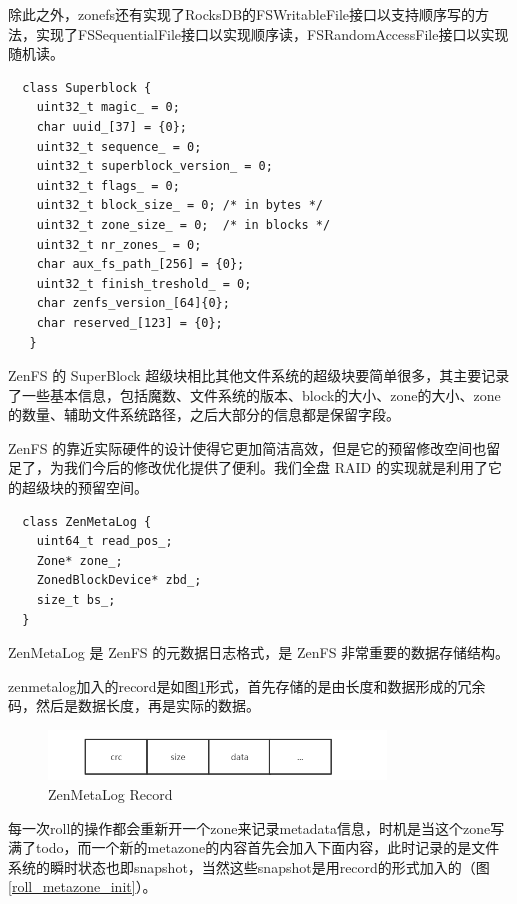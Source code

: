 除此之外，zonefs还有实现了RocksDB的FSWritableFile接口以支持顺序写的方法，实现了FSSequentialFile接口以实现顺序读，FSRandomAccessFile接口以实现随机读。


\begin{lstlisting}
  class Superblock {
    uint32_t magic_ = 0;
    char uuid_[37] = {0};
    uint32_t sequence_ = 0;
    uint32_t superblock_version_ = 0;
    uint32_t flags_ = 0;
    uint32_t block_size_ = 0; /* in bytes */
    uint32_t zone_size_ = 0;  /* in blocks */
    uint32_t nr_zones_ = 0;
    char aux_fs_path_[256] = {0};
    uint32_t finish_treshold_ = 0;
    char zenfs_version_[64]{0};
    char reserved_[123] = {0};
   }  
\end{lstlisting}

ZenFS 的 SuperBlock 超级块相比其他文件系统的超级块要简单很多，其主要记录了一些基本信息，包括魔数、文件系统的版本、block的大小、zone的大小、zone的数量、辅助文件系统路径，之后大部分的信息都是保留字段。

ZenFS 的靠近实际硬件的设计使得它更加简洁高效，但是它的预留修改空间也留足了，为我们今后的修改优化提供了便利。我们全盘 RAID 的实现就是利用了它的超级块的预留空间。


\begin{lstlisting}
  class ZenMetaLog {
    uint64_t read_pos_;
    Zone* zone_;
    ZonedBlockDevice* zbd_;
    size_t bs_;
  }  
\end{lstlisting}

ZenMetaLog 是 ZenFS 的元数据日志格式，是 ZenFS 非常重要的数据存储结构。

zenmetalog加入的record是如图\ref{meta_form}形式，首先存储的是由长度和数据形成的冗余码，然后是数据长度，再是实际的数据。

\begin{figure}[htbp]
  \centering
  \includegraphics[width=0.8\textwidth]{fig/meta_form}
  \caption{ZenMetaLog Record}
  \label{meta_form}
\end{figure}

每一次roll的操作都会重新开一个zone来记录metadata信息，时机是当这个zone写满了todo，而一个新的metazone的内容首先会加入下面内容，此时记录的是文件系统的瞬时状态也即snapshot，当然这些snapshot是用record的形式加入的（图\ref{roll_metazone_init}）。

